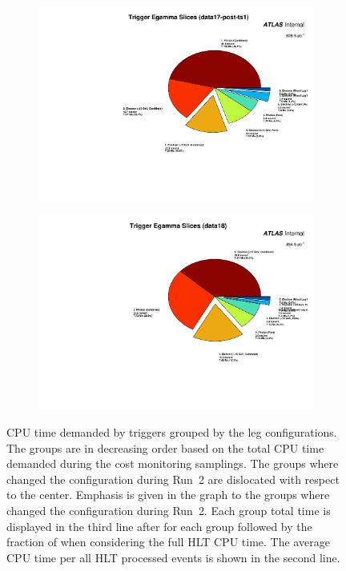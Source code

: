 \begin{figure}[h!tb]
\begin{subfigure}[c]{.48\textwidth}
\caption{}%
\label{fig:run2_monitored_egamma_cpu_data17_pre}
\end{subfigure} \\
\begin{subfigure}[c]{.48\textwidth}
  \includegraphics[width=\textwidth]{appendices/figures/menu_cpu_measurements/run2_slice_cpu_egamma_pie_data17-post-ts1.pdf}
\caption{}%
\label{fig:run2_monitored_egamma_cpu_data17_post}
\end{subfigure}
\begin{subfigure}[c]{.48\textwidth}
  \includegraphics[width=\textwidth]{appendices/figures/menu_cpu_measurements/run2_slice_cpu_egamma_pie_data18.pdf}
\caption{}%
\label{fig:run2_monitored_egamma_cpu_data18}
\end{subfigure}
\caption{\label{fig:run2_monitored_egamma_cpu}CPU time demanded by
\egamma{} triggers grouped by the leg configurations. The groups are in
decreasing order based on the total CPU time demanded during the cost monitoring
samplings. The groups where \rnn changed the configuration during Run~2 are
dislocated with respect to the center. Emphasis is given in the graph to the
groups where \rnn{} changed the configuration during Run~2. Each group total
time is displayed in the third line after for each group followed by the
fraction of when considering the full HLT CPU time. The average CPU time per all
HLT processed events is shown in the second line.
}
\end{figure}

